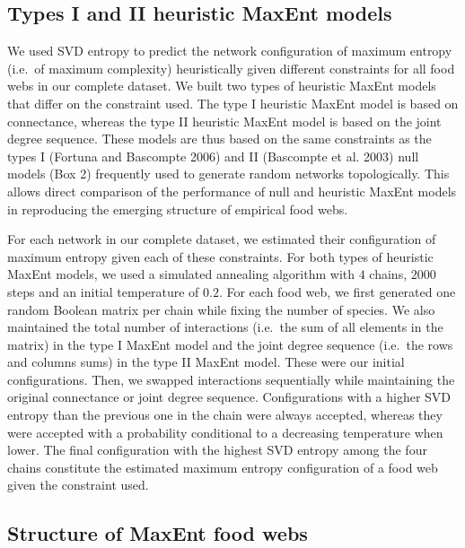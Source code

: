 \documentclass[11pt]{article}
\begin{document}
\hypertarget{types-i-and-ii-heuristic-maxent-models}{%
\subsection{Types I and II heuristic MaxEnt
models}\label{types-i-and-ii-heuristic-maxent-models}}

We used SVD entropy to predict the network configuration of maximum
entropy (i.e.~of maximum complexity) heuristically given different
constraints for all food webs in our complete dataset. We built two
types of heuristic MaxEnt models that differ on the constraint used. The
type I heuristic MaxEnt model is based on connectance, whereas the type
II heuristic MaxEnt model is based on the joint degree sequence. These
models are thus based on the same constraints as the types I (Fortuna
and Bascompte 2006) and II (Bascompte et al. 2003) null models (Box 2)
frequently used to generate random networks topologically. This allows
direct comparison of the performance of null and heuristic MaxEnt models
in reproducing the emerging structure of empirical food webs.

For each network in our complete dataset, we estimated their
configuration of maximum entropy given each of these constraints. For
both types of heuristic MaxEnt models, we used a simulated annealing
algorithm with \(4\) chains, \(2000\) steps and an initial temperature
of \(0.2\). For each food web, we first generated one random Boolean
matrix per chain while fixing the number of species. We also maintained
the total number of interactions (i.e.~the sum of all elements in the
matrix) in the type I MaxEnt model and the joint degree sequence
(i.e.~the rows and columns sums) in the type II MaxEnt model. These were
our initial configurations. Then, we swapped interactions sequentially
while maintaining the original connectance or joint degree sequence.
Configurations with a higher SVD entropy than the previous one in the
chain were always accepted, whereas they were accepted with a
probability conditional to a decreasing temperature when lower. The
final configuration with the highest SVD entropy among the four chains
constitute the estimated maximum entropy configuration of a food web
given the constraint used.

\hypertarget{structure-of-maxent-food-webs}{%
\subsection{Structure of MaxEnt food
webs}\label{structure-of-maxent-food-webs}}
\end{document}
